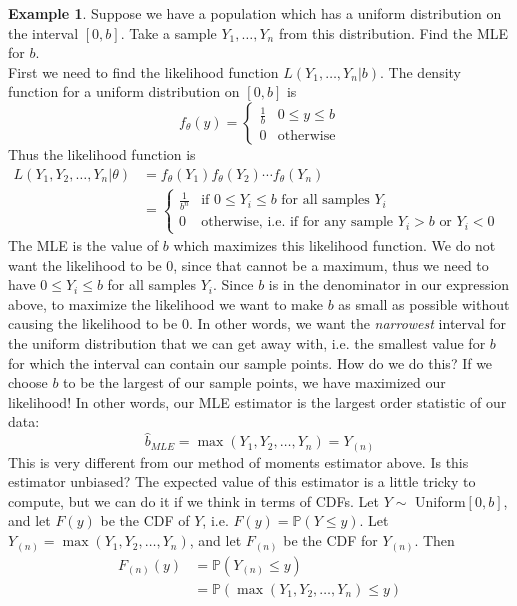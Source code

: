 \documentclass[12pt]{article}
\theoremstyle{definition}
\newtheorem*{example}{Example}
\theoremstyle{remark}
\def\P{{\mathbb P}}
\begin{document}
\begin{example}Suppose we have a population which has a uniform distribution on the interval $[0, b]$. Take a sample $Y_1, \dots, Y_n$ from this distribution. Find the MLE for $b$.\\

First we need to find the likelihood function $L(Y_1, \dots, Y_n|b)$. The density function for a uniform distribution on $[0, b]$ is
\[
f_\theta(y) = \begin{cases}
\frac{1}{b} & 0 \leq y \leq b \\
0 & \text{otherwise}
\end{cases}
\]
Thus the likelihood function is 
\begin{align*}
L(Y_1, Y_2, \dots, Y_n|\theta) &= f_\theta(Y_1) f_\theta(Y_2) \cdots f_\theta(Y_n) \\
&= \begin{cases}
\frac{1}{b^n} & \text{if $0 \leq Y_i \leq b$ for all samples $Y_i$} \\
0 & \text{otherwise, i.e. if for any sample $Y_i > b$ or $Y_i < 0$ }
\end{cases}
\end{align*}
The MLE is the value of $b$ which maximizes this likelihood function. We do not want the likelihood to be 0, since that cannot be a maximum, thus we need to have $0 \leq Y_i \leq b$ for all samples $Y_i$. Since $b$ is in the denominator in our expression above, to maximize the likelihood we want to make $b$ as small as possible without causing the likelihood to be 0. In other words, we want the \emph{narrowest} interval for the uniform distribution that we can get away with, i.e. the smallest value for $b$ for which the interval can contain our sample points. How do we do this? If we choose $b$ to be the largest of our sample points, we have maximized our likelihood! In other words, our MLE estimator is the largest order statistic of our data:
\[
\hat{b}_{MLE} = \max(Y_1, Y_2, \dots, Y_n) = Y_{(n)}
\]
This is very different from our method of moments estimator above. Is this estimator unbiased? The expected value of this estimator is a little tricky to compute, but we can do it if we think in terms of CDFs. Let $Y \sim$ Uniform$[0, b]$, and let $F(y)$ be the CDF of $Y$, i.e. $F(y) = \P(Y \leq y)$. Let $Y_{(n)} = \max(Y_1, Y_2, \dots, Y_n)$, and let $F_{(n)}$ be the CDF for $Y_{(n)}$. Then
\begin{align*}
F_{(n)}(y) &= \P(Y_{(n)} \leq y) \\
&= \P(\max(Y_1, Y_2, \dots, Y_n) \leq y) \\

\end{align*}
\end{example}
\end{document}
